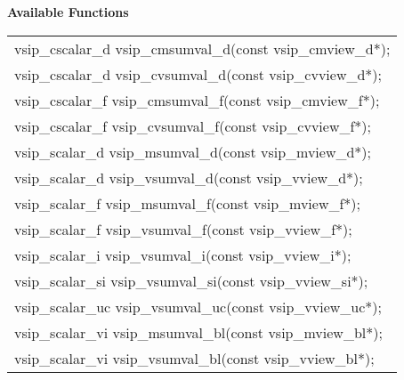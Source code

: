 \\\cvsiplh
\\ \hspace*{.8cm} \vspace*{.1cm} \textbf{Available Functions }
\\ \hspace*{1.1cm} {
\ttfamily
\begin{tabular}[H]{l}
vsip\_cscalar\_d vsip\_cmsumval\_d(const vsip\_cmview\_d*);\\
vsip\_cscalar\_d vsip\_cvsumval\_d(const vsip\_cvview\_d*);\\
vsip\_cscalar\_f vsip\_cmsumval\_f(const vsip\_cmview\_f*);\\
vsip\_cscalar\_f vsip\_cvsumval\_f(const vsip\_cvview\_f*);\\
vsip\_scalar\_d vsip\_msumval\_d(const vsip\_mview\_d*);\\
vsip\_scalar\_d vsip\_vsumval\_d(const vsip\_vview\_d*);\\
vsip\_scalar\_f vsip\_msumval\_f(const vsip\_mview\_f*);\\
vsip\_scalar\_f vsip\_vsumval\_f(const vsip\_vview\_f*);\\
vsip\_scalar\_i vsip\_vsumval\_i(const vsip\_vview\_i*);\\
vsip\_scalar\_si vsip\_vsumval\_si(const vsip\_vview\_si*);\\
vsip\_scalar\_uc vsip\_vsumval\_uc(const vsip\_vview\_uc*);\\
vsip\_scalar\_vi vsip\_msumval\_bl(const vsip\_mview\_bl*);\\
vsip\_scalar\_vi vsip\_vsumval\_bl(const vsip\_vview\_bl*);\\
\end{tabular}
}
\\\pyjvsiph